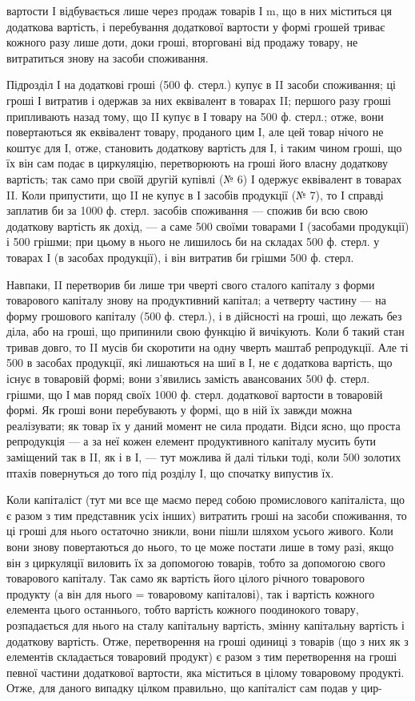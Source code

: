 вартости І відбувається лише через продаж товарів І m, що в них
міститься ця додаткова вартість, і перебування додаткової вартости у
формі грошей триває кожного разу лише доти, доки гроші, вторговані
від продажу товару, не витратиться знову на засоби споживання.

Підрозділ І на додаткові гроші (500 ф. стерл.) купує в II засоби
споживання; ці гроші І витратив і одержав за них еквівалент в товарах II;
першого разу гроші припливають назад тому, що II купує в І товару
на 500 ф. стерл.; отже, вони повертаються як еквівалент товару, проданого
цим І, але цей товар нічого не коштує для І, отже, становить додаткову
вартість для І, і таким чином гроші, що їх він сам
подає в циркуляцію, перетворюють на гроші його
власну додаткову вартість; так само при своїй другій купівлі
(№ 6) І одержує еквівалент в товарах II. Коли припустити, що II не
купує в І засобів продукції (№ 7), то І справді заплатив би за 1000 ф.
стерл. засобів споживання — спожив би всю свою додаткову вартість як
дохід, — а саме 500 своїми товарами І (засобами продукції) і 500 грішми;
при цьому в нього не лишилось би на складах 500 ф. стерл. у товарах І
(в засобах продукції), і він витратив би грішми 500 ф. стерл.

Навпаки, II перетворив би лише три чверті свого сталого капіталу
з форми товарового капіталу знову на продуктивний капітал; а четверту
частину — на форму грошового капіталу (500 ф. стерл.), і в дійсності на
гроші, що лежать без діла, або на гроші, що припинили свою функцію
й вичікують. Коли б такий стан тривав довго, то II мусів би скоротити
на одну чверть маштаб репродукції. Але ті 500 в засобах продукції,
які лишаються на шиї в І, не є додаткова вартість, що існує в товаровій
формі; вони з’явились замість авансованих 500 ф. стерл. грішми, що І мав
поряд своїх 1000 ф. стерл. додаткової вартости в товаровій формі. Як
гроші вони перебувають у формі, що в ній їх завжди можна реалізувати;
як товар їх у даний момент не сила продати. Відси ясно, що проста
репродукція — а за неї кожен елемент продуктивного капіталу мусить бути
заміщений так в II, як і в І, — тут можлива й далі тільки тоді, коли 500 золотих
птахів повернуться до того під розділу І, що спочатку випустив їх.

Коли капіталіст (тут ми все ще маємо перед собою промислового капіталіста,
що є разом з тим представник усіх інших) витратить гроші на
засоби споживання, то ці гроші для нього остаточно зникли, вони пішли
шляхом усього живого. Коли вони знову повертаються до нього, то це
може постати лише в тому разі, якщо він з циркуляції виловить їх за допомогою
товарів, тобто за допомогою свого товарового капіталу. Так само
як вартість його цілого річного товарового продукту (а він для нього = товаровому
капіталові), так і вартість кожного елемента цього останнього, тобто
вартість кожного поодинокого товару, розпадається для нього на сталу капітальну
вартість, змінну капітальну вартість і додаткову вартість. Отже,
перетворення на гроші одиниці з товарів (що з них як з елементів складається
товаровий продукт) є разом з тим перетворення на гроші певної частини
додаткової вартости, яка міститься в цілому товаровому продукті. Отже,
для даного випадку цілком правильно, що капіталіст сам подав у цир-
